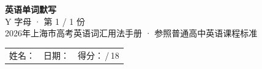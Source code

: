 \documentclass[10pt,a4paper]{article}
\begin{document}
\pagestyle{plain}

\begin{center}
{\LARGE\bfseries 英语单词默写}\\[0.22em]
{\large Y 字母 · 第 1 / 1 份}\\[0.18em]
{\small 2026年上海市高考英语词汇用法手册 · 参照普通高中英语课程标准}
\end{center}

\vspace{0.25em}
\noindent\begin{tabular}{@{}p{}@{}p{}@{}p{}@{}}
姓名：\underline{\hspace{2.0cm}} & 日期：\underline{\hspace{2.0cm}} & 得分：\underline{\hspace{1.3cm}}\,/\,18 \\
\end{tabular}

\vspace{0.3em}

\vspace{0.08em}
\end{document}
